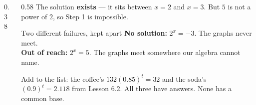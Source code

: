 \documentclass[aspectratio=169, 11pt]{beamer}
\newcommand{\lgrid}[4]{%
  \draw[step=1, linegray!45, thin] (#1,#3) grid (#2,#4);
  \draw[->, thick, charcoal] (#1,0)--(#2,0) node[below right, font=\tiny]{$x$};
  \draw[->, thick, charcoal] (0,#3)--(0,#4) node[left, font=\tiny]{$y$};}
\newcommand{\expgraph}[6]{\draw[very thick, forest, domain=#5:#6, samples=140, smooth]
  plot (\x,{(#1)*exp((#2)*((\x)-(#3)))+(#4)});}
\newcommand{\solline}[3]{\draw[goldacc, very thick] (#1,#3)--(#2,#3);}
\begin{document}
\begin{frame}[t, plain]
  \begin{columns}[T]
    \begin{column}{0.38\textwidth}
      \centering
    \end{column}
    \begin{column}{0.58\textwidth}
      \footnotesize
      The solution \textbf{exists} --- it sits between $x=2$ and $x=3$. But $5$ is not a power of $2$,
      so Step 1 is impossible.
      \vspace{4pt}
      \begin{block}{Two different failures, kept apart}
        \textbf{No solution:} $2^{x}=-3$. The graphs never meet. \\[3pt]
        \textbf{Out of reach:} $2^{x}=5$. The graphs meet somewhere our algebra cannot name.
      \end{block}
      \vspace{4pt}
      {\scriptsize Add to the list: the coffee's $132(0.85)^{t}=32$ and the soda's $(0.9)^{t}=2.118$
      from Lesson 6.2. All three have answers. None has a common base.}
    \end{column}
  \end{columns}
\end{frame}
\end{document}
